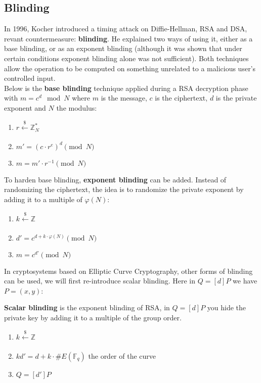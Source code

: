 \documentclass[a4paper,11pt]{article}
\begin{document}
\subsection{Blinding}

In 1996, Kocher\cite{Kocher} introduced a timing attack on Diffie-Hellman, RSA and DSA, revant countermeasure: \textbf{blinding}. He explained two ways of using it, either as a base blinding, or as an exponent blinding (although it was shown that under certain conditions exponent blinding alone was not sufficient\cite{schindler}). Both techniques allow the operation to be computed on something unrelated to a malicious user's controlled input.\\

Below is the \textbf{base blinding} technique applied during a RSA decryption phase with $m = c^d \mod{N}$ where $m$ is the message, $c$ is the ciphertext, $d$ is the private exponent and $N$ the modulus:

\begin{enumerate}
\item{$r  \xleftarrow[]{\$} \mathbb{Z}_N^{\ast}$}
\item{$m' = (c \cdot r^e)^d \pmod{N}$}
\item{$m = m' \cdot r^{-1} \pmod{N}$}
\end{enumerate}

To harden base blinding, \textbf{exponent blinding} can be added. Instead of randomizing the ciphertext, the idea is to randomize the private exponent by adding it to a multiple of $\varphi(N)$:

\begin{enumerate}
    \item{$k \xleftarrow[]{\$} \mathbb{Z}$}
    \item{$d' = c^{d + k \cdot \varphi(N)} \pmod{N}$}
    \item{$m = c^{d'} \pmod{N}$}
\end{enumerate}

In cryptosystems based on Elliptic Curve Cryptography, other forms of blinding can be used, we will first re-introduce scalar blinding. Here in $Q = [d]P$ we have $P=(x,y)$:

\textbf{Scalar blinding} is the exponent blinding of RSA, in $Q = [d]P$ you hide the private key by adding it to a multiple of the group order.

\begin{enumerate}
\item{$k \xleftarrow[]{\$} \mathbb{Z}$}
\item{$k d' = d + k \cdot \#E(\mathbb{F}_q)$ the order of the curve}
\item{$Q = [d']P$}
\end{enumerate}
\end{document}
